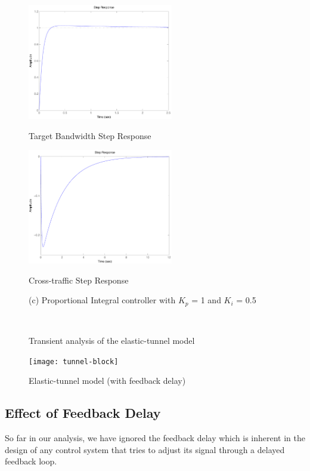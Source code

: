 \documentclass{article}
\begin{document}
\begin{figure}[thbp]
\begin{center}
\begin{minipage}{0.4\textwidth} 
   \includegraphics[width=2.5in]{plots/trans/PI_step_B_1_05.pdf} 
\centerline{Target Bandwidth Step Response}
\end{minipage}
\hspace{1.2cm}
\begin{minipage}{0.4\textwidth} 
   \includegraphics[width=2.5in]{plots/trans/PI_step_x_1_05.pdf} 
\centerline{Cross-traffic Step Response}
\end{minipage}
\centerline{(c) Proportional Integral controller with $K_p$ = 1 and $K_i$ =
0.5}\\
\caption{Transient analysis of the elastic-tunnel model}
\label{fig:trans1} 
\end{center}
\end{figure}

\begin{figure}[tbp]
   \texttt{[image: tunnel-block]} 
\caption{Elastic-tunnel model (with feedback delay)} 
\label{fig:block2}
\end{figure}

\subsection{Effect of Feedback Delay}
So far in our analysis, we have ignored the feedback delay which is
inherent in the design of any control system 
that tries to adjust its signal through
a delayed feedback loop.
\end{document}
